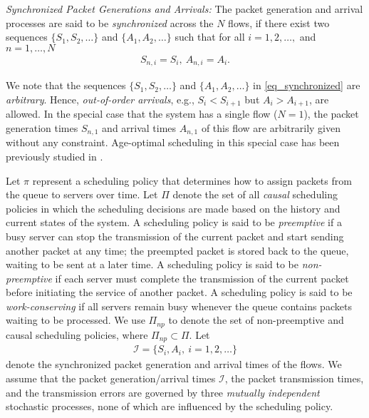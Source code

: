 \begin{definition} \emph{Synchronized Packet Generations and Arrivals:}
The packet generation and arrival processes are said to be \emph{synchronized} across  the $N$ flows, if there exist two sequences $\{S_1, S_2,\ldots\}$ and $\{A_1,A_2,\ldots\}$ such that for all $i=1,2,\ldots,$ and $n=1,\ldots,N$
\begin{align}\label{eq_synchronized}
S_{n,i} = S_i,~A_{n,i} = A_i.
\end{align}
\end{definition}
We note that the sequences $\{S_1, S_2,\ldots\}$ and $\{A_1,A_2,\ldots\}$ in  \eqref{eq_synchronized} are \emph{arbitrary}. Hence,
\emph{out-of-order arrivals}, e.g., $S_i < S_{i+1}$ but $A_i > A_{i+1}$, are allowed. In the special case that the system has a single flow ($N=1$), the packet generation times $S_{n,1}$ and arrival times $A_{n,1}$ of this flow are {arbitrarily} given without any constraint. Age-optimal scheduling in this special case has been previously studied in \cite{Bedewy2016,BedewyJournal2017,Bedewy2017,BedewyMultihop2017}. 



Let $\pi$ represent a scheduling policy that determines how to assign  packets from the  queue to servers over time. Let $\Pi$ denote the set of all \emph{causal} scheduling policies in which the scheduling decisions are made based on the history and current states of the system.
A scheduling policy is said to be \emph{preemptive} if a busy server can stop the transmission of the current packet and start sending another packet at any time; the preempted packet is stored back to the queue, waiting to be sent at a later time.
A scheduling policy is said to be \emph{non-preemptive} if each server must complete the transmission of the current packet before initiating the service of another packet. A scheduling policy is said to be \emph{work-conserving} if all servers remain busy whenever the queue contains packets waiting to be processed.  We use $\Pi_{np}$ to denote the set of non-preemptive and causal scheduling policies, where $\Pi_{np}\subset \Pi$. 
Let 
\begin{align}
\mathcal{I}=\{S_{i}, A_{i},~ i=1,2,\ldots\} 
\end{align}
denote the synchronized packet generation and arrival times of the flows. 
We assume that the packet generation/arrival times $\mathcal{I}$, the packet transmission times, and the transmission errors are
governed  by three \emph{mutually independent}  stochastic processes, none of which are influenced by the  scheduling policy. 

